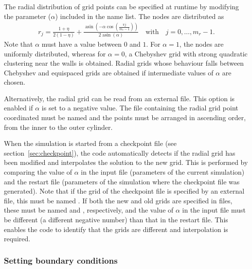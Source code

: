 \documentclass[a4paper, 11pt, DIV=11]{scrartcl}
\begin{document}
The radial distribution of grid points can be specified at runtime by modifying the
 parameter ($\alpha$) included in the  name list. The
nodes are distributed as
\begin{align*}
r_j = \frac{1+\eta}{2(1-\eta)} +
\frac{\operatorname{asin}\left(-\alpha\cos\left(\frac{\pi j}{m_r-1}\right)\right)}
{2\operatorname{asin}\left(\alpha\right)}
\quad\text{with}\quad
j=0,\dots, m_r-1
\text{.}
\end{align*}
Note that $\alpha$ must have a value between $0$ and $1$. For $\alpha = 1$, the nodes are
uniformly distributed, whereas for $\alpha = 0$, a Chebyshev grid with strong quadratic
clustering near the walls is obtained. Radial grids whose behaviour falls between Chebyshev
and equispaced grids are obtained if intermediate values of $\alpha$ are chosen.
\par
Alternatively, the radial grid can be read from an external file. This option is
enabled if $\alpha$ is set to a negative value. The file containing the radial grid point
coordinated must be named  and the points must be arranged
in ascending order, \ie from the inner to the outer cylinder.
\par
When the simulation is started from a checkpoint file (see section~\ref{sec:checkpoint}),
the code automatically detects if the radial grid has been modified and interpolates the
solution to the new grid. This is performed by comparing the value of $\alpha$ in the input
file (parameters of the current simulation) and the restart file (parameters of the simulation
where the checkpoint file was generated). Note that if the grid of the checkpoint file is
specified by an external file, this must be named . If
both the new and old grids are specified in files, these must be named 
and , respectively, and the value of $\alpha$ in the input
file must be different (\ie a different negative number) than that in the restart file. This
enables the code to identify that the grids are different and interpolation is required.


\subsubsection{Setting boundary conditions}
\label{sec:boundaryConditions}
\end{document}
